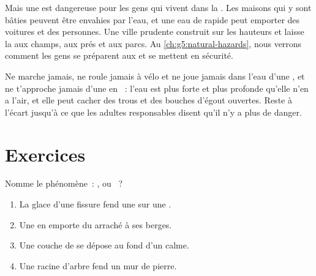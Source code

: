 Mais une  est dangereuse pour les gens qui vivent dans la . Les maisons qui y sont bâties peuvent être envahies par
l'eau, et une eau de  rapide peut emporter des voitures et des
personnes. Une ville prudente construit sur les hauteurs et laisse la
 aux champs, aux prés et aux parcs. Au
\cref{ch:g5:natural-hazards}, nous verrons comment les gens se préparent
aux  et se mettent en sécurité.

\begin{safety}
Ne marche jamais, ne roule jamais à vélo et ne joue jamais dans l'eau d'une
, et ne t'approche jamais d'une  en ~: l'eau est plus forte
et plus profonde qu'elle n'en a l'air, et elle peut cacher des trous et des
bouches d'égout ouvertes. Reste à l'écart jusqu'à ce que les adultes
responsables disent qu'il n'y a plus de danger.
\end{safety}

\section{Exercices}

\begin{exercise}[$\star$]\label{exo:g5:water-shapes-the-land:1}
Nomme le phénomène~: ,  ou ~?
\begin{enumerate}
  \item[(a)] La glace d'une fissure fend une  sur une .
  \item[(b)] Une  en  emporte du  arraché à ses berges.
  \item[(c)] Une couche de  se dépose au fond d'un  calme.
  \item[(d)] Une racine d'arbre fend un mur de pierre.
\end{enumerate}
\end{exercise}

